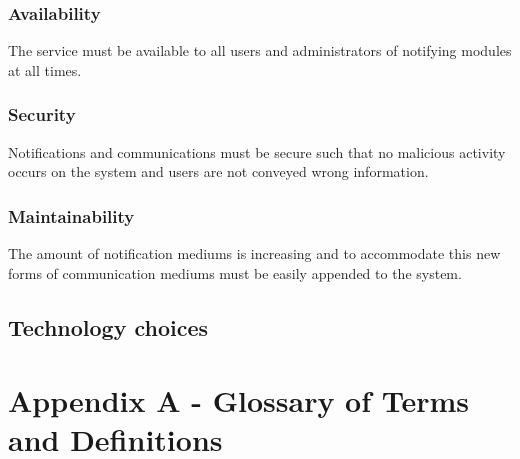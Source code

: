 \documentclass{article}
\begin{document}
    	\subsubsection{Availability}    
    \begin{flushleft}
The service must be available to all users and administrators of notifying modules at all times.
    \end{flushleft}
    
    	\subsubsection{Security}    
    \begin{flushleft}
    Notifications and communications must be secure such that no malicious activity occurs on the system and users are not conveyed wrong information.
    \end{flushleft}
    
    	\subsubsection{Maintainability}    
    \begin{flushleft}
    The amount of notification mediums is increasing and to accommodate this new forms of communication mediums must be easily appended to the system.
    \end{flushleft}
    
\subsection{Technology choices}
\newpage
\section{Appendix A - Glossary of Terms and Definitions}
\end{document}
